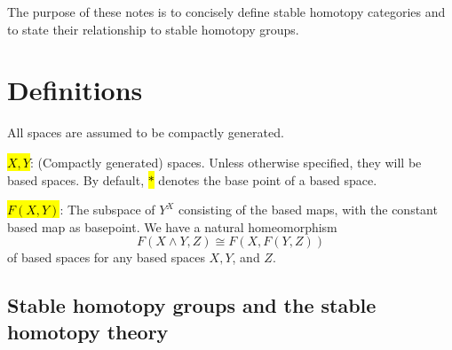 The purpose of these notes is to concisely define stable homotopy categories and to state their relationship to stable homotopy groups.

\section{Definitions}

All spaces are assumed to be compactly generated. 

\hl{$X, Y$}: (Compactly generated) spaces. Unless otherwise specified, they will be based spaces. By default, \hl{$*$} denotes the base point of a based space.

















\hl{$F(X,Y)$}: The subspace of $Y^X$ consisting of the based maps, with the constant based map as basepoint. We have a natural homeomorphism
$$F(X \wedge Y, Z) \cong F(X, F(Y,Z))$$
of based spaces for any based spaces $X,Y$, and $Z$. 












\subsection{Stable homotopy groups and the stable homotopy theory}


